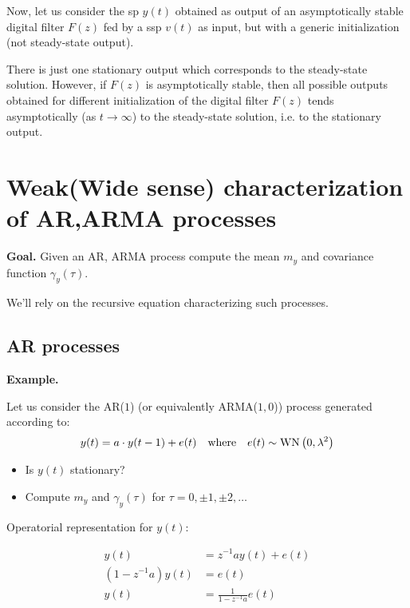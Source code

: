 Now, let us consider the \gls{sp} $y(t)$ obtained as output of an asymptotically stable digital filter $F(z)$ fed by a \gls{ssp} $v(t)$ as input, but with a generic initialization (not steady-state output).


\begin{theorem}
	There is just one stationary output which corresponds to the steady-state solution. However, if $F(z)$ is asymptotically stable, then all possible outputs obtained for different initialization of the digital filter $F(z)$ tends asymptotically (as $t \rightarrow \infty$) to the steady-state solution, i.e. to the stationary output.
\end{theorem}


\section{Weak(Wide sense) characterization of AR,ARMA processes}
\textbf{Goal.} Given an AR, ARMA process compute the mean $m_y$ and covariance function $\gamma_y(\tau)$.


We'll rely on the recursive equation characterizing such processes.

\subsection{AR processes}
\textbf{Example.}

Let us consider the AR($1$) (or equivalently ARMA($1,0$)) process generated according to:
\begin{align*}
	y(t)=a \cdot y(t-1)+e(t) \quad \text{where} \quad e(t) \sim \operatorname{WN}\left(0, \lambda^{2}\right)
\end{align*}

\begin{itemize}
	\item Is $y(t)$ stationary?
	\item Compute $m_{y}$ and $\gamma_{y}(\tau)$ for $\tau=0, \pm 1, \pm 2, \ldots$
\end{itemize}

Operatorial representation for $y(t)$:

\begin{align*}
	y(t)&=z^{-1} a y(t)+e(t) \\
	\left(1-z^{-1} a\right) y(t)&=e(t) \\
	y(t)&=\frac{1}{1-z^{-1} a} e(t)
\end{align*}

